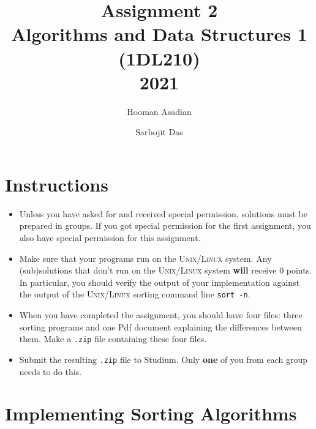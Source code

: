 \documentclass{article}
\title{Assignment 2 \\ Algorithms and Data Structures 1 (1DL210) \\ 2021}
\author{Hooman Asadian \and Sarbojit Das}
\begin{document}
\maketitle

\section*{Instructions}

\begin{itemize}
\item Unless you have asked for and received special permission, solutions must be prepared in groups.
If you got special permission for the first assignment, you also have special permission for this assignment.
%
\item Make sure that your programs run on the \textsc{Unix/Linux} system.
Any (sub)solutions that don't run on the \textsc{Unix/Linux} system {\bf will} receive 0 points.
In particular, you should verify the output of your implementation against the output of the  \textsc{Unix/Linux} sorting 
command line \texttt{sort -n}. 
% 
\item When you have completed the assignment, you should have four files: three sorting programs and one Pdf document explaining the differences between them.
Make a {\tt .zip} file containing these four files.
\item Submit the resulting {\tt .zip} file to Studium. Only {\bf one} of you from each group needs to do this.
\end{itemize}

\section*{Implementing Sorting Algorithms}
\end{document}
